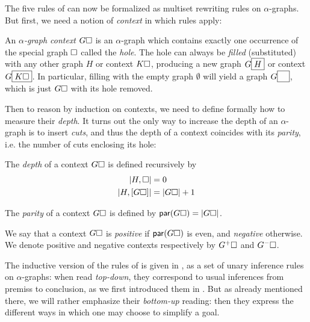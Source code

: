 The five rules of  can now be formalized as multiset rewriting rules
on $\alpha$-graphs. But first, we need a notion of \emph{context} in which rules
apply:

\begin{definition}
  An \emph{$\alpha$-graph context} $G\square$ is an $\alpha$-graph which contains
  exactly one occurrence of the special graph $\square$ called the \emph{hole}.
  The hole can always be \emph{filled} (substituted) with any other graph $H$ or
  context $K\square$, producing a new graph $G\fbox{$H$}$ or context
  $G\fbox{$K\square$}$. In particular, filling with the empty graph $\emptyset$
  will yield a graph $G\fbox{$\phantom{G}$}$, which is just $G\square$ with its
  hole removed.
\end{definition}

Then to reason by induction on contexts, we need to define formally how to
measure their \emph{depth}. It turns out the only way to increase the depth of
an $\alpha$-graph is to insert \emph{cuts}, and thus the depth of a context
coincides with its \emph{parity}, i.e. the number of cuts enclosing its hole:

\begin{definition}[Depth]
  The \emph{depth} of a context $G\square$ is defined recursively by
  \begin{align*}
    \left|H, \square\right| &= 0 \\
    \left|H, [G\square]\right| &= \left|G\square\right| + 1
  \end{align*}
\end{definition}

\begin{definition}[Parity]
  The \emph{parity} of a context $G\square$ is defined by $\mathsf{par}(G\square) =
  \left|G\square\right|$.
\end{definition}

\begin{definition}[Polarity]
  We say that a context $G\square$ is \emph{positive} if $\mathsf{par}(G\square)$ is
  even, and \emph{negative} otherwise. We denote positive and negative contexts
  respectively by $G^+\square$ and $G^-\square$.
\end{definition}

The inductive version of the rules of  is given in , as
a set of unary inference rules on $\alpha$-graphs: when read \emph{top-down},
they correspond to usual inferences from premiss to conclusion, as we first
introduced them in .
But as already mentioned there, we will rather emphasize their \emph{bottom-up}
reading: then they express the different ways in which one may choose to
simplify a goal.

